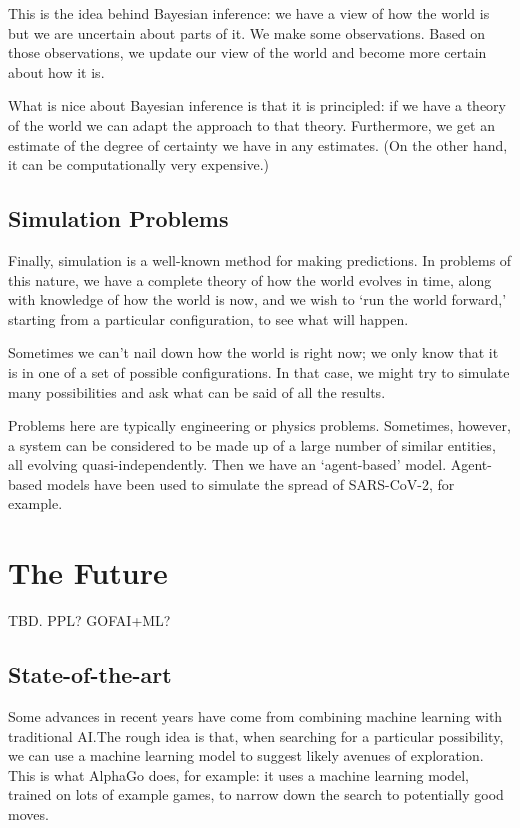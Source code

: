 \documentclass[10pt, a4, twocolumn]{article}
\begin{document}
This is the idea behind Bayesian inference: we have a view of how the world is
but we are uncertain about parts of it. We make some observations. Based on
those observations, we update our view of the world and become more certain
about how it is.

What is nice about Bayesian inference is that it is principled: if we have a
theory of the world we can adapt the approach to that theory. Furthermore, we
get an estimate of the degree of certainty we have in any estimates. (On the
other hand, it can be computationally very expensive.)

\subsection{Simulation Problems}

Finally, simulation is a well-known method for making predictions. In problems
of this nature, we have a complete theory of how the world evolves in time,
along with knowledge of how the world is now, and we wish to `run the world
forward,' starting from a particular configuration, to see what will happen.

Sometimes we can't nail down how the world is right now; we only know that it is
in one of a set of possible configurations. In that case, we might try to
simulate many possibilities and ask what can be said of all the results.

Problems here are typically engineering or physics problems. Sometimes, however,
a system can be considered to be made up of a large number of similar entities,
all evolving quasi-independently. Then we have an `agent-based'
model. Agent-based models have been used to simulate the spread of SARS-CoV-2,
for example.

\section{The Future}

TBD. PPL? GOFAI+ML? 


\subsection{State-of-the-art}

Some advances in recent years have come from combining machine learning with
traditional AI.\@ The rough idea is that, when searching for a particular
possibility, we can use a machine learning model to suggest likely avenues of
exploration. This is what AlphaGo does, for example: it uses a machine learning
model, trained on lots of example games, to narrow down the search to
potentially good moves.
\end{document}
